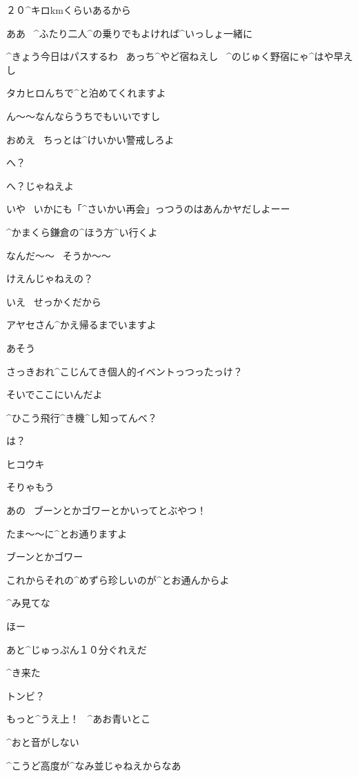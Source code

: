 \Alpha ２０^{キロ}{km}くらいあるから

\Alpha ああ
\ ^{ふたり}{二人}^{の}{乗}りでもよければ^{いっしょ}{一緒}に

\Ayase ^{きょう}{今日}はパスするわ
\ あっち^{やど}{宿}ねえし
\ ^{のじゅく}{野宿}にゃ^{はや}{早}えし

\page[70]
\Alpha タカヒロんちで^{と}{泊}めてくれますよ

\Alpha ん〜〜なんならうちでもいいですし

\Ayase おめえ
\ ちっとは^{けいかい}{警戒}しろよ

\Alpha へ？

\Ayase へ？じゃねえよ

\Ayase いや
\ いかにも「^{さいかい}{再会}」っつうのはあんかヤだしよーー

\Ayase ^{かまくら}{鎌倉}の^{ほう}{方}^{い}{行}くよ

\Alpha なんだ〜〜
\ そうか〜〜

\page[71]
\Ayase けえんじゃねえの？

\Alpha いえ
\ せっかくだから

\Alpha アヤセさん^{かえ}{帰}るまでいますよ

\Ayase あそう

\Ayase さっきおれ^{こじんてき}{個人的}イベントっつったっけ？

\Ayase そいでここにいんだよ

\page[72]
\Ayase ^{ひこう}{飛行}^{き}{機}^{し}{知}ってんべ？

\Alpha は？

\Alpha ヒコウキ

\Alpha そりゃもう

\Alpha あの
\ ブーンとかゴワーとかいってとぶやつ！

\Alpha たま〜〜に^{とお}{通}りますよ

\Ayase ブーンとかゴワー

\Ayase これからそれの^{めずら}{珍}しいのが^{とお}{通}んからよ

\Ayase ^{み}{見}てな

\Alpha ほー

\Ayase あと^{じゅっぷん}{１０分}ぐれえだ

\page[73]
\Ayase ^{き}{来}た

\Alpha トンビ？

\Ayase もっと^{うえ}{上}！
\ ^{あお}{青}いとこ

\page[76]
\Alpha ^{おと}{音}がしない

\Ayase ^{こうど}{高度}が^{なみ}{並}じゃねえからなあ

